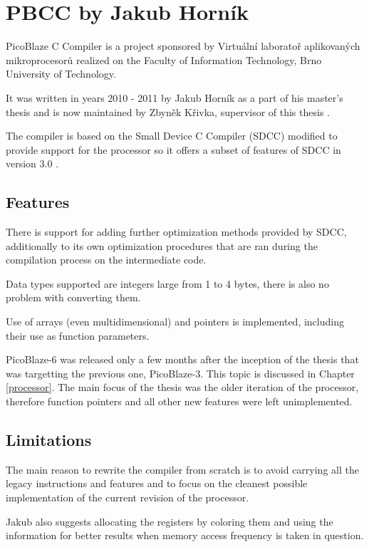     \section{PBCC by Jakub Horník}\label{prev_pbcc}

    PicoBlaze C Compiler is a project sponsored by Virtuální laboratoř aplikovaných mikroprocesorů
    realized on the Faculty of Information Technology, Brno University of Technology.

    It was written in years 2010 - 2011 by Jakub Horník as a part of his master's thesis and is now maintained by Zbyněk Křivka, supervisor of this thesis \cite{PbccProjekt}.

    The compiler is based on the Small Device C Compiler (SDCC) modified to provide support for the processor so it offers a subset of features of SDCC in version 3.0 \cite{PbccHornik}.

        \subsection{Features}

        There is support for adding further optimization methods provided by SDCC, additionally to its own optimization procedures 
        that are ran during the compilation process on the intermediate code.

        Data types supported are integers large from 1 to 4 bytes, there is also no problem with converting them.

        Use of arrays (even multidimensional) and pointers is implemented, including their use as function parameters.

        PicoBlaze-6 was released only a few months after the inception of the thesis that was targetting the previous one, PicoBlaze-3. This topic is discussed in Chapter \ref{processor}. The main focus of the thesis was the older iteration of the processor, therefore function pointers and all other new features were left unimplemented.

        \subsection{Limitations}

        The main reason to rewrite the compiler from scratch is to avoid carrying all the legacy instructions and features and to focus on the cleanest possible implementation of the current revision of the processor.

        Jakub also suggests allocating the registers by coloring them and using the information for better results when memory access frequency is taken in question.

